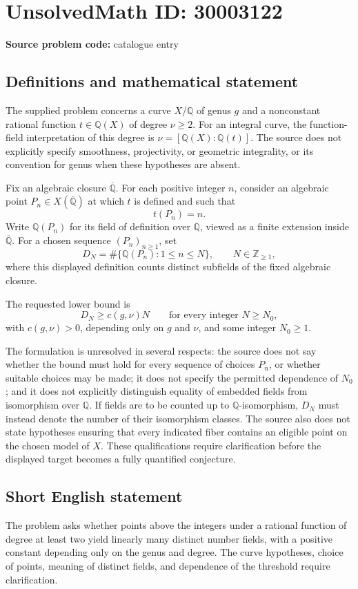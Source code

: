 \documentclass[11pt]{article}
\newcommand{\Z}{\mathbb{Z}}
\newcommand{\Q}{\mathbb{Q}}
\begin{document}
\section*{UnsolvedMath ID: 30003122}
\textbf{Source problem code:} catalogue entry
\subsection{Definitions and mathematical statement}
The supplied problem concerns a curve \(X/\Q\) of genus \(g\) and a nonconstant rational function \(t\in\Q(X)\) of degree \(\nu\geq2\). For an integral curve, the function-field interpretation of this degree is \(\nu=[\Q(X):\Q(t)]\). The source does not explicitly specify smoothness, projectivity, or geometric integrality, or its convention for genus when these hypotheses are absent.

Fix an algebraic closure \(\overline{\Q}\). For each positive integer \(n\), consider an algebraic point \(P_n\in X(\overline{\Q})\) at which \(t\) is defined and such that
\[
t(P_n)=n.
\]
Write \(\Q(P_n)\) for its field of definition over \(\Q\), viewed as a finite extension inside \(\overline{\Q}\). For a chosen sequence \((P_n)_{n\geq1}\), set
\[
D_N=\#\{\Q(P_n):1\leq n\leq N\},\qquad N\in\Z_{\geq1},
\]
where this displayed definition counts distinct subfields of the fixed algebraic closure.

The requested lower bound is
\[
D_N\geq c(g,\nu)N
\qquad\text{for every integer }N\geq N_0,
\]
with \(c(g,\nu)>0\), depending only on \(g\) and \(\nu\), and some integer \(N_0\geq1\).

The formulation is unresolved in several respects: the source does not say whether the bound must hold for every sequence of choices \(P_n\), or whether suitable choices may be made; it does not specify the permitted dependence of \(N_0\); and it does not explicitly distinguish equality of embedded fields from isomorphism over \(\Q\). If fields are to be counted up to \(\Q\)-isomorphism, \(D_N\) must instead denote the number of their isomorphism classes. The source also does not state hypotheses ensuring that every indicated fiber contains an eligible point on the chosen model of \(X\). These qualifications require clarification before the displayed target becomes a fully quantified conjecture.
\subsection{Short English statement}
The problem asks whether points above the integers under a rational function of degree at least two yield linearly many distinct number fields, with a positive constant depending only on the genus and degree. The curve hypotheses, choice of points, meaning of distinct fields, and dependence of the threshold require clarification.
\end{document}
